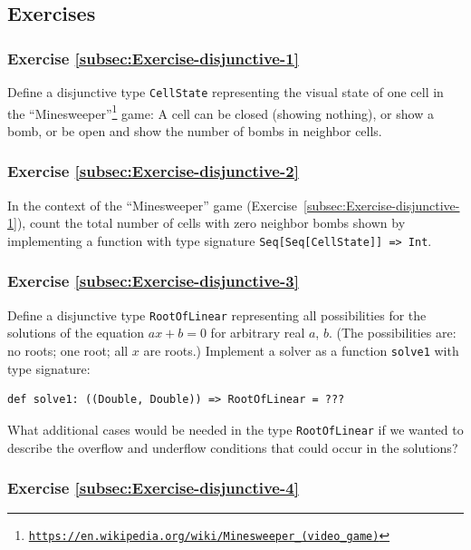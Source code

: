\subsection{Exercises}

\subsubsection{Exercise \label{subsec:Exercise-disjunctive-1}\ref{subsec:Exercise-disjunctive-1}}

Define a disjunctive type \lstinline!CellState! representing the
visual state of one cell in the \textsf{``}Minesweeper\textsf{''}\footnote{\texttt{\href{https://en.wikipedia.org/wiki/Minesweeper_(video_game)}{https://en.wikipedia.org/wiki/Minesweeper\_(video\_game)}}}
game: A cell can be closed (showing nothing), or show a bomb, or be
open and show the number of bombs in neighbor cells.

\subsubsection{Exercise \label{subsec:Exercise-disjunctive-2}\ref{subsec:Exercise-disjunctive-2}}

In the context of the \textsf{``}Minesweeper\textsf{''} game (Exercise~\ref{subsec:Exercise-disjunctive-1}),
count the total number of cells with zero neighbor bombs shown by
implementing a function with type signature \lstinline!Seq[Seq[CellState]] => Int!.

\subsubsection{Exercise \label{subsec:Exercise-disjunctive-3}\ref{subsec:Exercise-disjunctive-3}}

Define a disjunctive type \lstinline!RootOfLinear! representing all
possibilities for the solutions of the equation $ax+b=0$ for arbitrary
real $a$, $b$. (The possibilities are: no roots; one root; all $x$
are roots.) Implement a solver as a function \lstinline!solve1! with
type signature: 
\begin{lstlisting}
def solve1: ((Double, Double)) => RootOfLinear = ???
\end{lstlisting}
What additional cases would be needed in the type \lstinline!RootOfLinear!
if we wanted to describe the overflow and underflow conditions that
could occur in the solutions?

\subsubsection{Exercise \label{subsec:Exercise-disjunctive-4}\ref{subsec:Exercise-disjunctive-4}}

